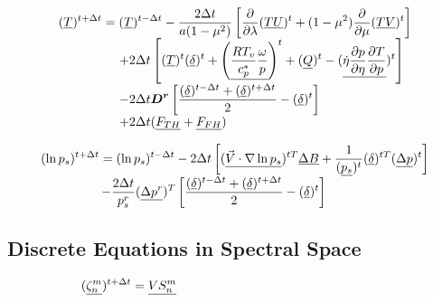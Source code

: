 \documentclass[12pt,a4paper]{book}
\begin{document}
	\begin{equation}
	\begin{array}{l}
	\displaystyle 
	(\underline{T})^{t+\Delta t} = (\underline{T})^{t-\Delta t} 
	- \frac{2\Delta t }{a(1-\mu^2)} \left[ \frac{\partial}{\partial \lambda} (\underline{T} \underline{U})^t 
	+ (1-\mu^2) \frac{\partial}{\partial \mu} (\underline{T} \underline{V})^t \right] \\
	\displaystyle 
	\hspace{4 pc} + 2\Delta t \left[ (\underline{T})^t (\underline{\delta})^t + \left(\underline{\frac{RT_v}{c_p^*} \frac{\omega}{p}} \right)^t
	+ (\underline{Q})^t - (\underline{\dot{\eta} \frac{\partial p}{\partial \eta} \frac{\partial T}{\partial p}})^t \right] \\
	\displaystyle 
	\hspace{4 pc} - 2\Delta t \boldsymbol{D^r} \left[\frac{(\underline{\delta})^{t-\Delta t} + (\underline{\delta})^{t+\Delta t}}{2}  - (\underline{\delta})^t \right] \\
	\hspace{4 pc} + 2\Delta t (\underline{F_{TH}}  + \underline{F_{FH}} )
	\end{array} 
	\end{equation}

	\begin{equation}
	\begin{array}{l}
	\displaystyle 
	(\ln p_s)^{t+\Delta t} = (\ln p_s)^{t-\Delta t} 
	\displaystyle 
	- 2\Delta t \left[ (\underline{\vec{V} \cdot \nabla \ln p_s})^{tT} \underline{\Delta B} + \frac{1}{(\underline{p_s})^t} (\underline{\delta})^{tT} (\underline{\Delta p})^t  \right] \\
	\displaystyle 
	\hspace{4 pc} - \frac{2\Delta t}{p_s^r} (\underline{\Delta p^r})^T \left[\frac{(\underline{\delta})^{t-\Delta t} + (\underline{\delta})^{t+\Delta t}}{2}  - (\underline{\delta})^t \right] \\

	\end{array} 
	\end{equation}

\subsection{Discrete Equations in Spectral Space}
	
	\begin{equation}
	(\underline{\zeta_n^m})^{t+\Delta t} = \underline{VS_n^m}  \hspace{14 pc}
	\end{equation}
\end{document}
